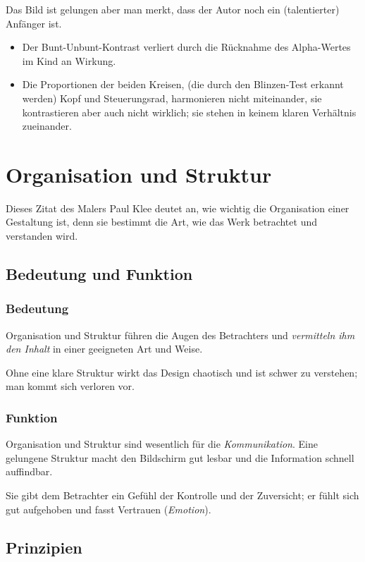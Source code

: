 Das Bild ist gelungen aber man merkt, dass der Autor noch ein (talentierter) Anfänger ist.

\begin{itemize}
\item Der Bunt-Unbunt-Kontrast verliert durch die Rücknahme des Alpha-Wertes im Kind an Wirkung.
\item Die Proportionen der beiden Kreisen, (die durch den Blinzen-Test erkannt werden) Kopf und Steuerungsrad, harmonieren nicht miteinander, sie kontrastieren aber auch nicht wirklich; sie stehen in keinem klaren Verhältnis zueinander.
\end{itemize}


\section{Organisation und Struktur}
Dieses Zitat des Malers Paul Klee deutet an, wie wichtig die Organisation einer Gestaltung ist, denn sie bestimmt die Art, wie das Werk betrachtet und verstanden wird.

\subsection{Bedeutung und Funktion}
\subsubsection*{Bedeutung }
Organisation und Struktur führen die Augen des Betrachters und \emph{vermitteln ihm den Inhalt} in einer geeigneten Art und Weise. 

Ohne eine klare Struktur wirkt das Design chaotisch und ist schwer zu verstehen; man kommt sich verloren vor.

\subsubsection*{Funktion}
Organisation und Struktur sind wesentlich für die \emph{Kommunikation}. Eine gelungene Struktur macht den Bildschirm gut lesbar und die Information schnell auffindbar. 

Sie gibt dem Betrachter ein Gefühl der Kontrolle und der Zuversicht; er fühlt sich gut aufgehoben und fasst Vertrauen (\emph{Emotion}).

\subsection{Prinzipien}
